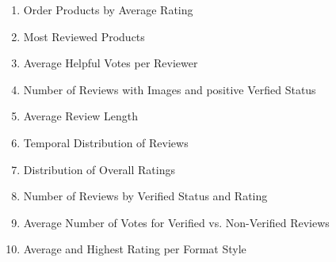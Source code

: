 \begin{enumerate}
    \item Order Products by Average Rating
    \item Most Reviewed Products
    \item Average Helpful Votes per Reviewer
    \item Number of Reviews with Images and positive Verfied Status
    \item Average Review Length
    \item Temporal Distribution of Reviews
    \item Distribution of Overall Ratings
    \item Number of Reviews by Verified Status and Rating
    \item Average Number of Votes for Verified vs. Non-Verified Reviews
    \item Average and Highest Rating per Format Style
\end{enumerate}

